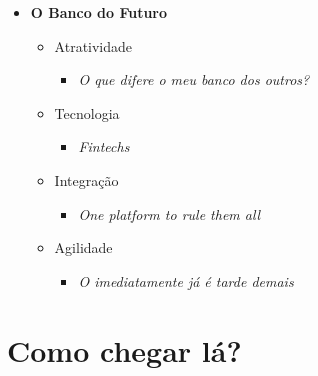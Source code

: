 \documentclass{beamer}
\begin{document}
\begin{frame}
    \begin{itemize}
     \item[] \textbf{O Banco do Futuro}\newline
	\begin{itemize}
	  \item[] Atratividade
	  \begin{itemize}
	   \item[] \textit{O que difere o meu banco dos outros?}\newline
	  \end{itemize}

	  \item[] Tecnologia
	    \begin{itemize}
	      \item[] \textit{Fintechs}\newline
	    \end{itemize}
	    
	 \item[] Integração
	    \begin{itemize}
	      \item[] \textit{One platform to rule them all}\newline
	    \end{itemize}
	    
	 \item[] Agilidade
	    \begin{itemize}
	      \item[] \textit{O imediatamente já é tarde demais}
	    \end{itemize}
	\end {itemize}
    \end{itemize}

\end{frame}

\section{Como chegar lá?}
\end{document}
